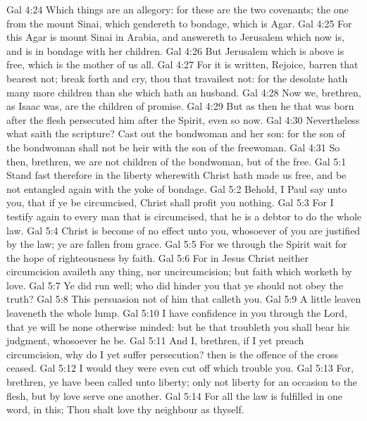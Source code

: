 \vs Gal 4:24 Which things are an allegory: for these are the two covenants; the one from the mount Sinai, which gendereth to bondage, which is Agar.
\vs Gal 4:25 For this Agar is mount Sinai in Arabia, and answereth to Jerusalem which now is, and is in bondage with her children.
\vs Gal 4:26 But Jerusalem which is above is free, which is the mother of us all.
\vs Gal 4:27 For it is written, Rejoice,  barren that bearest not; break forth and cry, thou that travailest not: for the desolate hath many more children than she which hath an husband.
\vs Gal 4:28 Now we, brethren, as Isaac was, are the children of promise.
\vs Gal 4:29 But as then he that was born after the flesh persecuted him  after the Spirit, even so  now.
\vs Gal 4:30 Nevertheless what saith the scripture? Cast out the bondwoman and her son: for the son of the bondwoman shall not be heir with the son of the freewoman.
\vs Gal 4:31 So then, brethren, we are not children of the bondwoman, but of the free.
\vs Gal 5:1 Stand fast therefore in the liberty wherewith Christ hath made us free, and be not entangled again with the yoke of bondage.
\vs Gal 5:2 Behold, I Paul say unto you, that if ye be circumcised, Christ shall profit you nothing.
\vs Gal 5:3 For I testify again to every man that is circumcised, that he is a debtor to do the whole law.
\vs Gal 5:4 Christ is become of no effect unto you, whosoever of you are justified by the law; ye are fallen from grace.
\vs Gal 5:5 For we through the Spirit wait for the hope of righteousness by faith.
\vs Gal 5:6 For in Jesus Christ neither circumcision availeth any thing, nor uncircumcision; but faith which worketh by love.
\vs Gal 5:7 Ye did run well; who did hinder you that ye should not obey the truth?
\vs Gal 5:8 This persuasion  not of him that calleth you.
\vs Gal 5:9 A little leaven leaveneth the whole lump.
\vs Gal 5:10 I have confidence in you through the Lord, that ye will be none otherwise minded: but he that troubleth you shall bear his judgment, whosoever he be.
\vs Gal 5:11 And I, brethren, if I yet preach circumcision, why do I yet suffer persecution? then is the offence of the cross ceased.
\vs Gal 5:12 I would they were even cut off which trouble you.
\vs Gal 5:13 For, brethren, ye have been called unto liberty; only  not liberty for an occasion to the flesh, but by love serve one another.
\vs Gal 5:14 For all the law is fulfilled in one word,  in this; Thou shalt love thy neighbour as thyself.
